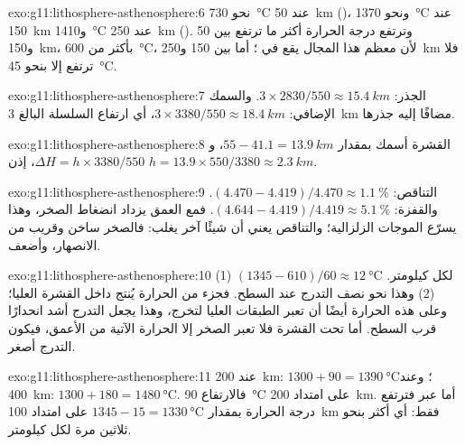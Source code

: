 \begin{solution}{exo:g11:lithosphere-asthenosphere:6}
نحو \qty{730}{\celsius} عند \qty{50}{km} ()، ونحو
\qty{1370}{\celsius} عند \qty{150}{km} و\qty{1410}{\celsius} عند
\qty{250}{km} (). وترتفع درجة الحرارة أكثر ما ترتفع بين 50
و\qty{150}{km}، بأكثر من \qty{600}{\celsius}، لأن معظم هذا
المجال يقع في ؛ أما بين 150 و\qty{250}{km} فلا ترتفع
إلا بنحو \qty{45}{\celsius}.
\end{solution}

\begin{solution}{exo:g11:lithosphere-asthenosphere:7}
الجذر: $3 \times 2830/550 \approx \qty{15.4}{km}$. والسمك الإضافي:
$3 \times 3380/550 \approx \qty{18.4}{km}$، أي ارتفاع السلسلة البالغ \qty{3}{km}
مضافًا إليه جذرها.
\end{solution}

\begin{solution}{exo:g11:lithosphere-asthenosphere:8}
القشرة أسمك بمقدار $55 - 41.1 = \qty{13.9}{km}$، و$\Delta H = h
\times 3380/550$، إذن $h = 13.9 \times 550/3380 \approx \qty{2.3}{km}$.
\end{solution}

\begin{solution}{exo:g11:lithosphere-asthenosphere:9}
التناقص: $(4.470 - 4.419)/4.470 \approx \qty{1.1}{\percent}$. والقفزة:
$(4.644 - 4.419)/4.419 \approx \qty{5.1}{\percent}$. فمع العمق يزداد انضغاط
الصخر، وهذا يسرّع الموجات الزلزالية؛ والتناقص يعني
أن شيئًا آخر يغلب: فالصخر ساخن وقريب من الانصهار، وأضعف.
\end{solution}

\begin{solution}{exo:g11:lithosphere-asthenosphere:10}
(1) $(1345 - 610)/60 \approx \qty{12}{\celsius}$ لكل كيلومتر. (2) وهذا
نحو نصف التدرج عند السطح. فجزء من الحرارة يُنتج داخل
القشرة العليا؛ وعلى هذه الحرارة أيضًا أن تعبر الطبقات العليا لتخرج، وهذا يجعل
التدرج أشد انحدارًا قرب السطح. أما تحت القشرة فلا تعبر الصخر إلا الحرارة الآتية
من الأعمق، فيكون التدرج أصغر.
\end{solution}

\begin{solution}{exo:g11:lithosphere-asthenosphere:11}
عند \qty{200}{km}: $1300 + 90 = \qty{1390}{\celsius}$؛ وعند \qty{400}{km}:
$1300 + 180 = \qty{1480}{\celsius}$. فالارتفاع \qty{90}{\celsius} على امتداد
\qty{200}{km}. أما عبر  فترتفع درجة الحرارة بمقدار
$1345 - 15 = \qty{1330}{\celsius}$ على امتداد \qty{100}{km} فقط: أي أكثر بنحو ثلاثين
مرة لكل كيلومتر.
\end{solution}

